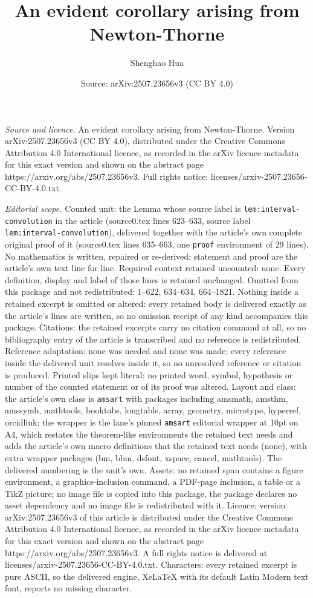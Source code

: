 \documentclass[10pt,a4paper]{amsart}
\title[An evident corollary arising from Newton-Thorne]{An evident corollary arising from Newton-Thorne}
\author{Shenghao Hua}
\date{Source: arXiv:2507.23656v3 (CC BY 4.0)}
\begin{document}
\maketitle

\noindent\emph{Source and licence.} An evident corollary arising from Newton-Thorne. Version arXiv:2507.23656v3 (CC BY 4.0), distributed under the Creative Commons Attribution 4.0 International licence, as recorded in the arXiv licence metadata for this exact version and shown on the abstract page https://arxiv.org/abs/2507.23656v3. Full rights notice: licenses/arxiv-2507.23656-CC-BY-4.0.txt.\par\smallskip

\noindent\textit{Editorial scope.} Counted unit: the Lemma whose source label is \texttt{lem:interval-convolution} in the article (source0.tex lines 623--633, source label \texttt{lem:interval-convolution}), delivered together with the article's own complete original proof of it (source0.tex lines 635--663, one \texttt{proof} environment of 29 lines). No mathematics is written, repaired or re-derived: statement and proof are the article's own text line for line. Required context retained uncounted: none. Every definition, display and label of those lines is retained unchanged. Omitted from this package and not redistributed: 1--622, 634--634, 664--1821. Nothing inside a retained excerpt is omitted or altered: every retained body is delivered exactly as the article's lines are written, so no omission receipt of any kind accompanies this package. Citations: the retained excerpts carry no citation command at all, so no bibliography entry of the article is transcribed and no reference is redistributed. Reference adaptation: none was needed and none was made; every reference inside the delivered unit resolves inside it, so no unresolved reference or citation is produced. Printed slips kept literal: no printed word, symbol, hypothesis or number of the counted statement or of its proof was altered. Layout and class: the article's own class is \texttt{amsart} with packages including amsmath, amsthm, amssymb, mathtools, booktabs, longtable, array, geometry, microtype, hyperref, orcidlink; the wrapper is the lane's pinned \texttt{amsart} editorial wrapper at 10pt on A4, which restates the theorem-like environments the retained text needs and adds the article's own macro definitions that the retained text needs (none), with extra wrapper packages (bm, bbm, dsfont, xspace, cancel, mathtools). The delivered numbering is the unit's own. Assets: no retained span contains a figure environment, a graphics-inclusion command, a PDF-page inclusion, a table or a TikZ picture; no image file is copied into this package, the package declares no asset dependency and no image file is redistributed with it. Licence: version arXiv:2507.23656v3 of this article is distributed under the Creative Commons Attribution 4.0 International licence, as recorded in the arXiv licence metadata for this exact version and shown on the abstract page https://arxiv.org/abs/2507.23656v3. A full rights notice is delivered at licenses/arxiv-2507.23656-CC-BY-4.0.txt. Characters: every retained excerpt is pure ASCII, so the delivered engine, XeLaTeX with its default Latin Modern text font, reports no missing character.
\end{document}
